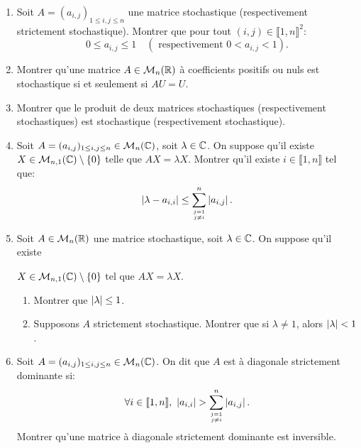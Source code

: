 \begin{enumerate}


 \item Soit $A = (a_{i,j})_{1\leq i,j\leq n}$ une matrice stochastique (respectivement strictement stochastique). Montrer que pour tout $(i,j)\in \llbracket 1, n\rrbracket^{2}$:
 \[ 0\leq a_{i,j}\leq 1 \quad (\text{  respectivement } 0 < a_{i,j} < 1).\]
 
 
 
 \item Montrer qu'une matrice $A\in \mathcal{M}_{n}(\mathbb{R})$ à coefficients positifs ou nuls est stochastique si et seulement si $AU = U$. 
 
 
 
 
 
 \item Montrer que le produit de deux matrices stochastiques (respectivement stochastiques) est stochastique (respectivement stochastique). 
 
 
 
 
 
 \item Soit $A = (a_{i,j})_{1\leq i,j\leq n}\in \mathcal{M}_{n}(\mathbb{C})$, soit $\lambda \in \mathbb{C}$. On suppose qu'il existe $X\in \mathcal{M}_{n,1}(\mathbb{C})\setminus \{ 0 \}$ telle que $AX = \lambda X$. Montrer qu'il existe 
 $i\in \llbracket 1, n\rrbracket$ tel que:
 \[ \abs{\lambda -a_{i,i}}\leq \sum_{\empil{j=1}{j\neq i}}^{n}\abs{a_{i,j}}.\]
 
  
 
 \item Soit $A\in \mathcal{M}_{n}(\mathbb{R})$ une matrice stochastique, soit $\lambda \in \mathbb{C}$. On suppose qu'il existe 
 
 $X\in \mathcal{M}_{n,1}(\mathbb{C})\setminus \{ 0 \}$ tel que $AX = \lambda X$. 
 \begin{enumerate}
  \item Montrer que $\left\vert\lambda\right\vert\leq 1$.  
 \item Supposons $A$ strictement stochastique. Montrer que si $\lambda \neq 1$, alors $\left\vert\lambda\right\vert < 1$. 
 \end{enumerate}

 
 
 
 \item Soit $A = (a_{i,j})_{1\leq i,j\leq n}\in \mathcal{M}_{n}(\mathbb{C})$. On dit que $A$ est à diagonale strictement dominante si:
 \[ \forall i\in \llbracket 1, n\rrbracket,\ \abs{a_{i,i}} > \sum_{\empil{j=1}{j\neq i}}^{n}\abs{a_{i,j}}.\]
 Montrer qu'une matrice à diagonale strictement dominante est inversible. 
 

\end{enumerate}
